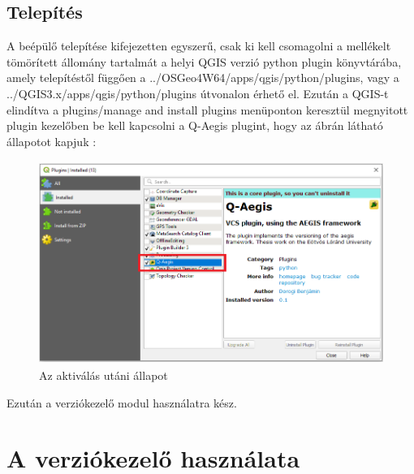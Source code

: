 \subsection{Telepítés}
A beépülő telepítése kifejezetten egyszerű, csak ki kell csomagolni a mellékelt tömörített állomány tartalmát a helyi QGIS verzió python plugin könyvtárába, amely telepítéstől függően a ../OSGeo4W64/apps/qgis/python/plugins, vagy a ../QGIS3.x/apps/qgis/python/plugins útvonalon érhető el. Ezután a QGIS-t elindítva a plugins/manage and install plugins menüponton keresztül megnyitott plugin kezelőben be kell kapcsolni a Q-Aegis plugint, hogy az ábrán látható állapotot kapjuk :
\begin{figure}[H]
	\centering
	\includegraphics[width=\textwidth,height=250px]{images/enable_plugin}
	\caption{Az aktiválás utáni állapot}
	\label{fig:picture-1}
\end{figure}

Ezután a verziókezelő modul használatra kész.
	
\section{A verziókezelő használata}
